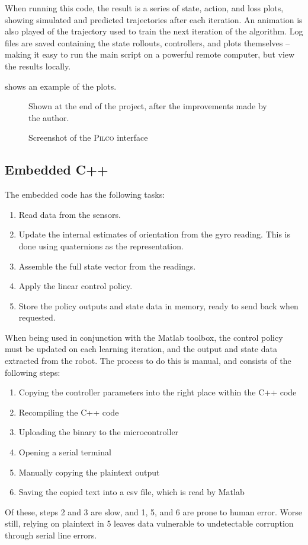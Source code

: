 \documentclass[main.tex]{subfiles}
\begin{document}
	When running this code, the result is a series of state, action, and loss plots, showing simulated and predicted trajectories after each iteration.
	An animation is also played of the trajectory used to train the next iteration of the algorithm.
	Log files are saved containing the state rollouts, controllers, and plots themselves -- making it easy to run the main script on a powerful remote computer, but view the results locally.

	 shows an example of the plots.

	\begin{figure}
		\caption{Screenshot of the \textsc{Pilco} interface}
		\label{fig:pilco-interface}
		\medskip
		\small
		Shown at the end of the project, after the improvements made by the author.
	\end{figure}

	\subsection{Embedded C++}

	The embedded code has the following tasks:
	\begin{enumerate}[noitemsep]
		\item Read data from the sensors.
		\item
			Update the internal estimates of orientation from the gyro reading.
			This is done using quaternions as the representation.
		\item Assemble the full state vector from the readings.
		\item Apply the linear control policy.
		\item Store the policy outputs and state data in memory, ready to send back when requested.
	\end{enumerate}
	When being used in conjunction with the Matlab toolbox, the control policy must be updated on each learning iteration, and the output and state data extracted from the robot.
	The process to do this is manual, and consists of the following steps:
	\begin{enumerate}[noitemsep]
		\item Copying the controller parameters into the right place within the C++ code
		\item Recompiling the C++ code
		\item Uploading the binary to the microcontroller
		\item Opening a serial terminal
		\item Manually copying the plaintext output
		\item Saving the copied text into a csv file, which is read by Matlab
	\end{enumerate}
	Of these, steps 2 and 3 are slow, and 1, 5, and 6 are prone to human error.
	Worse still, relying on plaintext in 5 leaves data vulnerable to undetectable corruption through serial line errors\footnotemark.
\end{document}
